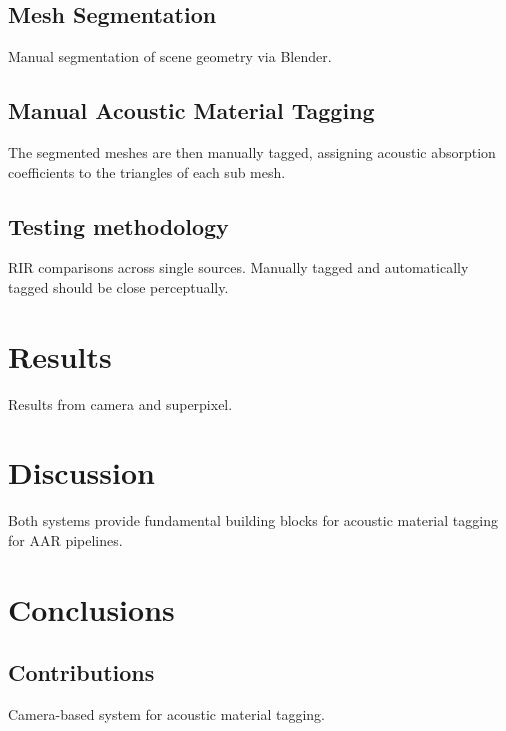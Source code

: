 \subsection{Mesh Segmentation}
Manual segmentation of scene geometry via Blender.

\subsection{Manual Acoustic Material Tagging}
The segmented meshes are then manually tagged, assigning acoustic absorption coefficients to the triangles of each sub mesh.

\subsection{Testing methodology}
RIR comparisons across single sources. Manually tagged and automatically tagged should be close perceptually.


\section{Results}
Results from camera and superpixel.



\section{Discussion}
Both systems provide fundamental building blocks for acoustic material tagging for AAR pipelines.

\section{Conclusions}

\subsection{Contributions}
Camera-based system for acoustic material tagging.

